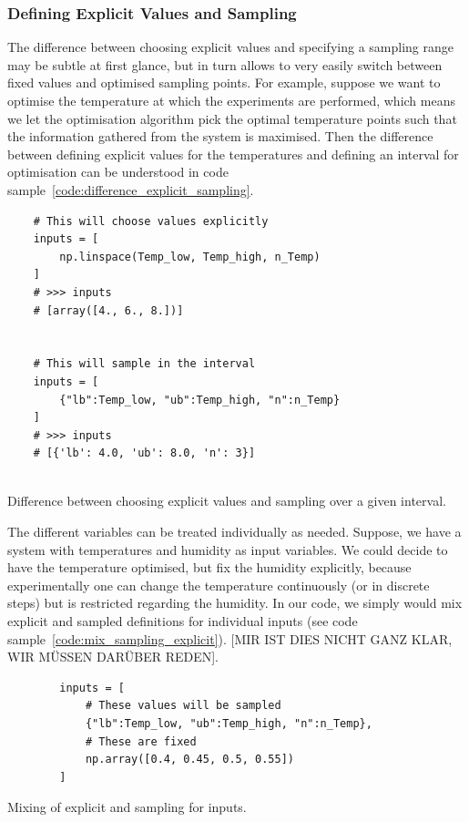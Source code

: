 \documentclass[10pt,A4paper]{article}
\begin{document}
\subsubsection*{Defining Explicit Values and Sampling}
The difference between choosing explicit values and specifying a sampling range may be subtle at first glance, but in turn allows to very easily switch between fixed values and optimised sampling points. 
For example, suppose we want to optimise the temperature at which the experiments are performed, which means we let the optimisation algorithm pick the optimal temperature points such that the information gathered from the system is maximised. 
Then the difference between defining explicit values for the temperatures and defining an interval for optimisation can be understood in code sample~\ref{code:difference_explicit_sampling}.\newline
\begin{code}[h]
    \begin{verbatim}
    # This will choose values explicitly
    inputs = [
        np.linspace(Temp_low, Temp_high, n_Temp)
    ]
    # >>> inputs
    # [array([4., 6., 8.])]


    # This will sample in the interval
    inputs = [
        {"lb":Temp_low, "ub":Temp_high, "n":n_Temp}
    ]
    # >>> inputs
    # [{'lb': 4.0, 'ub': 8.0, 'n': 3}]


    \end{verbatim}
    \caption{Difference between choosing explicit values and sampling over a given interval.}
    \label{code:difference_explicit_sampling}
\end{code}%
The different variables can be treated individually as needed. 
Suppose, we have a system with temperatures and humidity as input variables.
We could decide to have the temperature optimised, but fix the humidity explicitly, because experimentally one can change the temperature continuously (or in discrete steps) but is restricted regarding the humidity. 
In our code, we simply would mix explicit and sampled definitions for individual inputs (see code sample~\ref{code:mix_sampling_explicit}). 
[MIR IST DIES NICHT GANZ KLAR, WIR MÜSSEN DARÜBER REDEN].
\begin{code}[h]
    \begin{verbatim}
        inputs = [
            # These values will be sampled
            {"lb":Temp_low, "ub":Temp_high, "n":n_Temp},
            # These are fixed
            np.array([0.4, 0.45, 0.5, 0.55])
        ]
    \end{verbatim}
    \caption{Mixing of explicit and sampling for inputs.}
    \label{code:mix_sampling_explicit}
\end{code}
%
\end{document}

